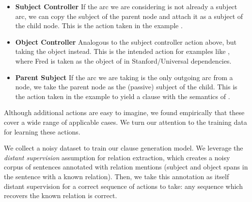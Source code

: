 \begin{itemize}[leftmargin=2ex]
\item[] \textbf{Subject Controller}  \hspace{1ex}
  If the arc we are considering is not already a subject arc,
    we can copy the subject of the parent node and attach it as a subject of the
    child node.
  This is the action taken in the example
    .

\item[] \textbf{Object Controller}  \hspace{1ex}
  Analogous to the subject controller action above, but taking the object
    instead.
  This is the intended action for examples like
    , where Fred is taken as
    the object of  in Stanford/Universal dependencies.

\item[] \textbf{Parent Subject} \hspace{1ex}
  If the arc we are taking is the only outgoing arc from a node, we take the
    parent node as the (passive) subject of the child.
  This is the action taken in the example
     to yield a clause with the
    semantics of .
\end{itemize}

Although additional actions are easy to imagine, we found empirically that
  these cover a wide range of applicable cases.
We turn our attention to the training data for learning these actions.

%
%
We collect a noisy dataset to train our clause generation model.
We leverage the \textit{distant supervision} assumption for relation extraction,
  which creates a noisy corpus of sentences annotated with relation mentions
  (subject and object spans in the sentence with a known relation).
Then, we take this annotation as itself distant supervision for a correct
  sequence of actions to take: any sequence which recovers the 
  known relation is correct.


